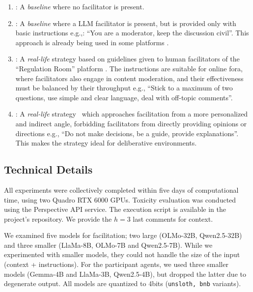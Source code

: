 \begin{enumerate}
    \item \textbf{\strategynomod}: A \emph{baseline} where no facilitator is present.

    \item \textbf{\strategynoinstr}: A \emph{baseline} where a LLM facilitator is present, but is provided only with basic instructions e.g.,: “You are a moderator, keep the discussion civil”. This approach is already being used in some platforms \cite{Tsai_Deliberate_Lab_Open-Source_2025}. 

    \item \textbf{\strategyregroom}: A \emph{real-life} strategy based on guidelines given to human facilitators of the ``Regulation Room'' platform \cite{Cornell_eRulemaking2017}. The instructions are suitable for online fora, where facilitators also engage in content moderation, and their effectiveness must be balanced by their throughput e.g., ``Stick to a maximum of two questions, use simple and clear language, deal with off-topic comments''.

    \item \textbf{\strategyconstrcomm}: A \emph{real-life} strategy~\cite{dimitra-guide} which approaches facilitation from a more personalized and indirect angle, forbidding facilitators from directly providing opinions or directions e.g., ``Do not make decisions, be a guide, provide explanations''. This makes the strategy ideal for deliberative environments.
\end{enumerate}



\subsection{Technical Details}
\label{ssec:experimental:setup}

All experiments were collectively completed within five days of computational time, using two Quadro RTX 6000 GPUs. Toxicity evaluation was conducted using the Perspective API service. The execution script is available in the project's repository. We provide the $h=3$ last comments for context.

We examined five models for facilitation; two large (OLMo-32B, Qwen2.5-32B) and three smaller (LlaMa-8B, OLMo-7B and Qwen2.5-7B). While we experimented with smaller models, they could not handle the size of the input (context + instructions). For the participant agents, we used three smaller models (Gemma-4B and LlaMa-3B, Qwen2.5-4B), but dropped the latter due to degenerate output. All models are quantized to 4bits (\texttt{unsloth, bnb} variants).